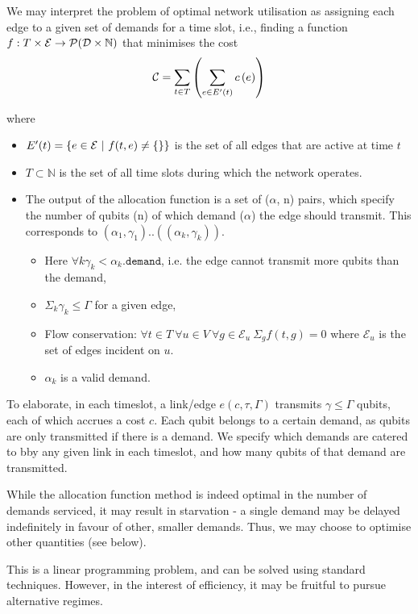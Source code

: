 \documentclass{amsart}
\begin{document}
    We may interpret the problem of optimal network utilisation as assigning each edge to a given set of demands for a time slot, i.e., finding a function \(f : T \times \mathcal{E} \rightarrow \mathcal{P}(\mathcal{D \times \mathbb{N}})\) that minimises the cost 
        \[\mathcal{C} = \sum_{t \in T} \left(\sum_{e \in E'(t)} c\left(e\right)\right)\]


    where \begin{itemize}
        \item \(E'(t) = \left\{e \in \mathcal{E} \ |\  f(t, e) \neq \{\} \right\}\) is the set of all edges that are active at time \(t\)
        \item \(T \subset \mathbb{N}\) is the set of all time slots during which the network operates.
        \item The output of the allocation function is a set of (\(\alpha\), n) pairs, which specify the number of qubits (n) of which demand (\(\alpha\)) the edge should transmit. This corresponds to \((\alpha_1, \gamma_1)..((\alpha_k, \gamma_k))\).
         \begin{itemize}
            \item  Here \(\forall k \gamma_k < \alpha_k\texttt{.demand}\), i.e. the edge cannot transmit more qubits than the demand,
            \item \(\Sigma_k \gamma_k \leq \Gamma\) for a given edge, 
            \item Flow conservation: \(\forall t \in T\ \forall u \in V\ \forall g \in \mathcal{E}_u\  \Sigma_g f(t, g) = 0\) where \(\mathcal{E}_u\) is the set of edges incident on \(u\).
            \item \(\alpha_k\) is a valid demand.
        \end{itemize}
    \end{itemize}

    To elaborate, in each timeslot, a link/edge \(e(c, \tau ,\Gamma)\) transmits \(\gamma \leq \Gamma\) qubits, each of which accrues a cost \(c\). Each qubit belongs to a certain demand, as qubits are only transmitted if there is a demand. We specify which demands are catered to bby any given link in each timeslot, and how many qubits of that demand are transmitted.

    While the allocation function method is indeed optimal in the number of demands serviced, it may result in starvation - a single demand may be delayed indefinitely in favour of other, smaller demands. Thus, we may choose to optimise other quantities (see below).

    This is a linear programming problem, and can be solved using standard techniques. However, in the interest of efficiency, it may be fruitful to pursue alternative regimes.
\end{document}
